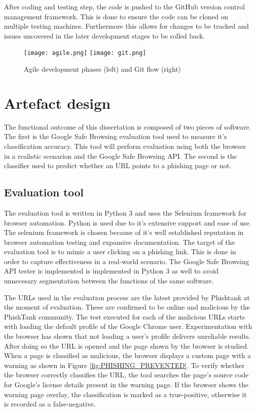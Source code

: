 After coding and testing step, the code is pushed to the GitHub version control management framework. This is done to ensure the code can be cloned on multiple testing machines. Furthermore this allows for changes to be tracked and issues uncovered in the later development stages to be rolled back.

\begin{figure}[b]
	\centering
	\texttt{[image: agile.png]}
	\texttt{[image: git.png]}
	\caption{Agile development phases (left) and Git flow (right)}
	\label{fig:INITIAL_ANALYSIS}
\end{figure}

\section{Artefact design}
The functional outcome of this dissertation is composed of two pieces of software. The first is the Google Safe Browsing evaluation tool used to measure it's classification accuracy. This tool will perform evaluation using both the browser in a realistic scenarion and the Google Safe Browsing API. The second is the classifier used to predict whether an URL points to a phishing page or not.

\subsection{Evaluation tool}
The evaluation tool is written in Python 3 and uses the Selenium framework for browser automation. Python is used due to it's extensive support and ease of use. The selenium framework is chosen because of it's well established reputation in browser automation testing and expansive documentation. The target of the evaluation tool is to mimic a user clicking on a phishing link. This is done in order to capture effectiveness in a real-world scenario. The Google Safe Browsing API tester is implemented is implemented in Python 3 as well to avoid unnecesary segmentation between the functions of the same software.

The URLs used in the evaluation process are the latest provided by Phishtank at the moment of evaluation. These are confirmed to be online and malicious by the PhishTank community. The test executed for each of the malicious URLs starts with loading the default profile of the Google Chrome user. Experimentation with the browser has shown that not loading a user's profile delivers unreliable results. After doing so the URL is opened and the page shown by the browser is studied. When a page is classified as malicious, the browser displays a custom page with a warning as shown in Figure \ref{fig:PHISHING_PREVENTED}. To verify whether the browser correctly classifies the URL, the tool searches the page's source code for Google's license details present in the warning page. If the browser shows the warning page overlay, the classification is marked as a true-positive, otherwise it is recorded as a false-negative.

